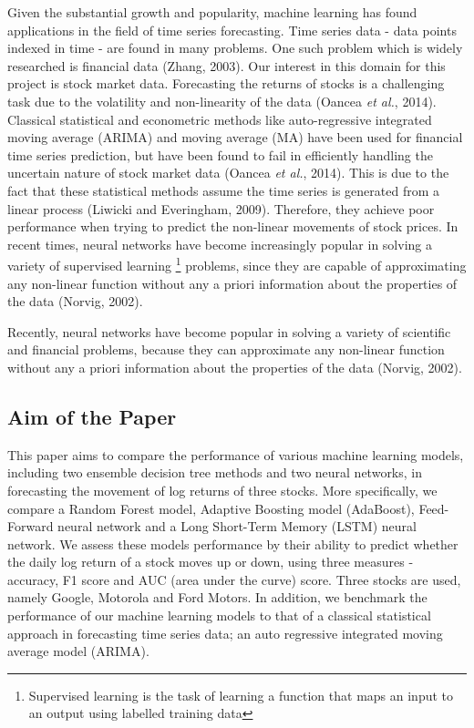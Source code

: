 Given the substantial growth and popularity, machine learning has found applications in the field of time series forecasting. Time series data - data points indexed in time -  are found in many problems. One such problem which is widely researched is financial data (Zhang, 2003). Our interest in this domain for this project is stock market data. Forecasting the returns of stocks is a challenging task due to the volatility and non-linearity of the data (Oancea \textit{et al.}, 2014). Classical statistical and econometric methods like auto-regressive integrated moving average (ARIMA) and moving average (MA) have been used for financial time series prediction, but have been found to fail in efficiently handling the uncertain nature of stock market data (Oancea \textit{et al.}, 2014). This is due to the fact that these statistical methods assume the time series is generated from a linear process (Liwicki and Everingham, 2009). Therefore, they achieve poor performance when trying to predict the non-linear movements of stock prices. In recent times, neural networks have become increasingly popular in solving a variety of supervised learning \footnote {Supervised learning is the task of learning a function that maps an input to an output using labelled training data} problems, since they are capable of approximating any non-linear function without any a priori information about the properties of the data (Norvig, 2002).


Recently, neural networks have become popular in solving a variety of scientific and financial problems, because they can approximate any non-linear function without any a priori information about the properties of the data (Norvig, 2002). 

\subsection{Aim of the Paper}

This paper aims to compare the performance of various machine learning models, including two ensemble decision tree methods and two neural networks, in forecasting the movement of log returns of three stocks. More specifically, we compare a Random Forest model, Adaptive Boosting model (AdaBoost), Feed-Forward neural network and a Long Short-Term Memory (LSTM) neural network. We assess these models performance by their ability to predict whether the daily log return of a stock moves up or down, using three measures - accuracy, F1 score and AUC (area under the curve) score. Three stocks are used, namely Google, Motorola and Ford Motors. In addition, we benchmark the performance of our machine learning models to that of a classical statistical approach in forecasting time series data; an auto regressive integrated moving average model (ARIMA).


